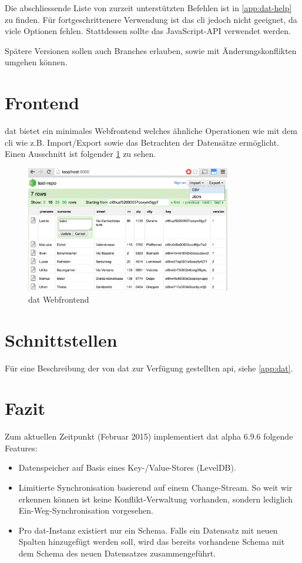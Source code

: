 Die abschliessende Liste von zurzeit unterstützten Befehlen ist in 
\vref{app:dat-help} zu finden. Für fortgeschrittenere Verwendung ist das \gls{cli} jedoch nicht geeignet, da viele Optionen fehlen. Stattdessen sollte das JavaScript-API verwendet werden.

Spätere Versionen sollen auch Branches erlauben, sowie mit Änderungskonflikten umgehen können.

\section{Frontend}

\Gls{dat} bietet ein minimales Webfrontend welches ähnliche Operationen wie mit dem \gls{cli} wie z.B. Import/Export sowie das Betrachten der Datensätze ermöglicht. Einen Ausschnitt ist folgender \cref{fig:dat:webfrontend} zu sehen.

\begin{figure}[H]
  \centering
  \includegraphics[width=0.8\textwidth]{fig/webfrontend}
  \caption{dat Webfrontend}
  \label{fig:dat:webfrontend}
\end{figure}

\section{Schnittstellen}
Für eine Beschreibung der von \gls{dat} zur Verfügung gestellten \gls{api}, siehe \vref{app:dat}.


\section{Fazit}
Zum aktuellen Zeitpunkt (Februar 2015) implementiert \gls{dat} alpha 6.9.6 folgende Features:
\begin{itemize}
\item Datenspeicher auf Basis eines Key-/Value-Stores (LevelDB).
\item Limitierte Synchronisation basierend auf einem Change-Stream. So weit wir erkennen können ist keine Konflikt-Verwaltung vorhanden, sondern lediglich Ein-Weg-Synchronisation vorgesehen.
\item Pro \gls{dat}-Instanz existiert nur ein Schema. Falls ein Datensatz mit neuen Spalten hinzugefügt werden soll, wird das bereits vorhandene Schema mit dem Schema des neuen Datensatzes zusammengeführt.
\end{itemize}

